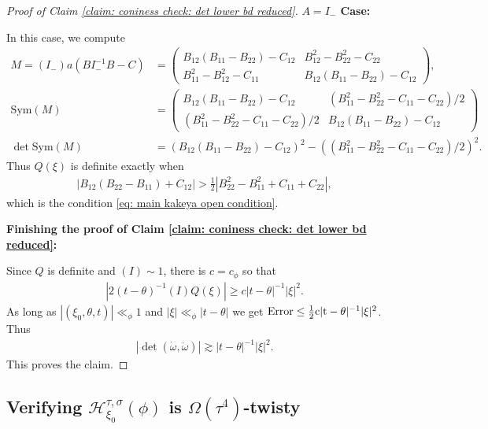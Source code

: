 \documentclass[12pt]{amsart}
\numberwithin{equation}{section}
\newcommand{\1}{\mathbbm{1}}
\newcommand{\sym}{\mathrm{Sym}}
\begin{document}
\begin{proof}[Proof of Claim \ref{claim: coniness check: det lower bd reduced}]
\noindent \textbf{$A = I_-$ Case: }

In this case, we compute 
\begin{align}
    M = (I_-)a(B I_-^{-1} B - C) &= 
    \begin{pmatrix}
        B_{12}(B_{11} - B_{22}) - C_{12} & B_{12}^2 - B_{22}^2 - C_{22} \\
        B_{11}^2 - B_{12}^2 - C_{11} & B_{12}(B_{11} - B_{22}) - C_{12}
    \end{pmatrix}, \\
    \sym(M) &= 
    \begin{pmatrix}
        B_{12}(B_{11} - B_{22}) - C_{12} & (B_{11}^2 - B_{22}^2 - C_{11} - C_{22})/2 \\
        (B_{11}^2 - B_{22}^2 - C_{11} - C_{22})/2 & B_{12}(B_{11} - B_{22}) - C_{12}
    \end{pmatrix} \\
    \det \sym(M) &= (B_{12}(B_{11} - B_{22}) - C_{12})^2 - ((B_{11}^2 - B_{22}^2 - C_{11} - C_{22})/2)^2.
\end{align}
Thus $Q(\xi)$ is definite exactly when 
\begin{align}
    |B_{12}(B_{22} - B_{11}) + C_{12}| > \frac{1}{2} |B_{22}^2 - B_{11}^2 + C_{11} + C_{22}|,
\end{align}
which is the condition \eqref{eq: main kakeya open condition}. 

\noindent \textbf{Finishing the proof of Claim \ref{claim: coniness check: det lower bd reduced}:}

Since $Q$ is definite and $(I) \sim 1$, there is $c = c_\phi$ so that 
\begin{align}
    |2(t - \theta)^{-1}(I) Q(\xi)| \geq c |t - \theta|^{-1} |\xi|^2.
\end{align}
As long as $|(\xi_0, \theta, t)| \ll_\phi 1$ and $|\xi| \ll_\phi |t - \theta|$ we get $\rm{Error} \leq \frac{1}{2} c |t- \theta|^{-1} |\xi|^2$. Thus 
\begin{align}
    |\det(\dot \omega, \ddot \omega)| \gtrsim |t - \theta|^{-1} |\xi|^2. 
\end{align}
This proves the claim. 
\end{proof}


\subsection{Verifying $\mathcal H_{\xi_0}^{\tau, \sigma}(\phi)$ is $\Omega(\tau^4)$-twisty}
\end{document}
